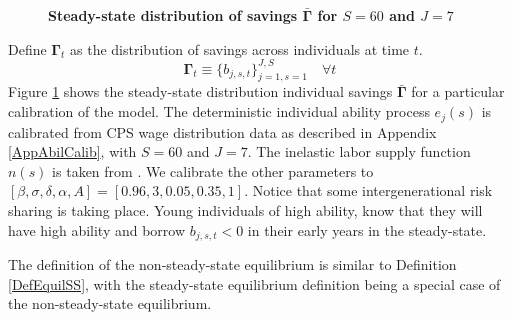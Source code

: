 \documentclass[letterpaper,12pt]{article}
\theoremstyle{definition}
\begin{document}
\begin{spacing}{1.5}
    \begin{figure}[htb]\centering \captionsetup{width=4.0in}
      \caption{\label{FigSavSS}\textbf{Steady-state distribution of savings $\bar{\bm{\Gamma}}$ for $S=60$ and $J=7$}}
    \end{figure}

    Define $\bm{\Gamma}_t$ as the distribution of savings across individuals at time $t$.
    \begin{equation}\label{EqSavDist}
      \bm{\Gamma}_t \equiv \{b_{j,s,t}\}_{j=1,s=1}^{J,S} \quad\forall t
    \end{equation}
    Figure \ref{FigSavSS} shows the steady-state distribution individual savings $\bar{\bm{\Gamma}}$ for a particular calibration of the model. The deterministic individual ability process $e_j(s)$ is calibrated from CPS wage distribution data as described in Appendix \ref{AppAbilCalib}, with $S=60$ and $J=7$. The inelastic labor supply function $n(s)$ is taken from \citet{EvansPhillips:2014}. We calibrate the other parameters to $[\beta,\sigma,\delta,\alpha,A] = [0.96,3,0.05,0.35,1]$. Notice that some intergenerational risk sharing is taking place. Young individuals of high ability, know that they will have high ability and borrow $b_{j,s,t}<0$ in their early years in the steady-state.

    The definition of the non-steady-state equilibrium is similar to Definition \ref{DefEquilSS}, with the steady-state equilibrium definition being a special case of the non-steady-state equilibrium.


\end{spacing}
\end{document}
